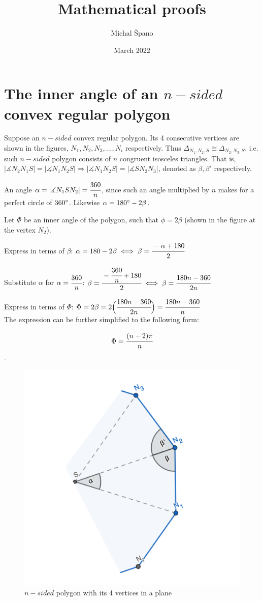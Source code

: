 \documentclass[10pt,a4paper]{article}
\title{\textbf{Mathematical proofs}}
\author{Michal Špano}
\date{March 2022}
\begin{document}
\maketitle

\section{The inner angle of an $n-sided$ convex regular polygon}

Suppose an $n-sided$ convex regular polygon. Its 4 consecutive vertices are shown in the figures, $N_1, N_2, N_3, ..., N_i$ respectively. 
Thus $\Delta_{N_1,N_2,S} \cong \Delta_{N_2,N_3,S}$, i.e. such $n-sided$ polygon consists of $n$ congruent isosceles triangles. 
That is, $|\measuredangle N_2 N_1 S| = |\measuredangle N_1 N_2 S| \Rightarrow |\measuredangle N_1 N_2 S| = |\measuredangle S N_2 N_3|$, denoted as $\beta, \beta'$ respectively. 

An angle $\alpha = |\measuredangle N_1 S N_2| = \cfrac{360}{n}$, since such an angle multiplied by $n$ makes for a perfect circle of $360\degree$. Likewise $\alpha = 180\degree - 2 \beta$.

Let $\Phi$ be an inner angle of the polygon, such that $\phi = 2 \beta$ (shown in the figure at the vertex $N_2$).

Express in terms of $\beta$: $\alpha = 180 - 2 \beta \iff \beta = \cfrac{-\alpha + 180}{2}$

Substitute $\alpha$ for $\alpha = \cfrac{360}{n}$: $\beta = \cfrac{-\cfrac{360}{n} + 180}{2} \iff \beta = \cfrac{180n - 360}{2n}$

Express in terms of $\Phi$: $\Phi = 2 \beta = 2 \Big( \cfrac{180n - 360}{2n} \Big) = \cfrac{180n - 360}{n}$ \\

The expression can be further simplified to the following form:

$$\Phi = \cfrac{(n-2) \pi}{n}$$.

\begin{figure}[htp]
    \centering
    \includegraphics[width=4.cm]{polygon_export.png}
    \caption{$n-sided$ polygon with its 4 vertices in a plane}
\end{figure}
\end{document}
